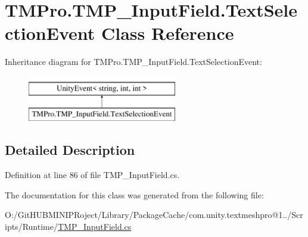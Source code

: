 \hypertarget{class_t_m_pro_1_1_t_m_p___input_field_1_1_text_selection_event}{}\section{T\+M\+Pro.\+T\+M\+P\+\_\+\+Input\+Field.\+Text\+Selection\+Event Class Reference}
\label{class_t_m_pro_1_1_t_m_p___input_field_1_1_text_selection_event}
Inheritance diagram for T\+M\+Pro.\+T\+M\+P\+\_\+\+Input\+Field.\+Text\+Selection\+Event\+:\begin{figure}[H]
\begin{center}
\leavevmode
\includegraphics[height=2.000000cm]{class_t_m_pro_1_1_t_m_p___input_field_1_1_text_selection_event}
\end{center}
\end{figure}


\subsection{Detailed Description}


Definition at line 86 of file T\+M\+P\+\_\+\+Input\+Field.\+cs.



The documentation for this class was generated from the following file\+:\begin{DoxyCompactItemize}
\item 
O\+:/\+Git\+H\+U\+B\+M\+I\+N\+I\+P\+Roject/\+Library/\+Package\+Cache/com.\+unity.\+textmeshpro@1../\+Scripts/\+Runtime/\mbox{\hyperlink{_t_m_p___input_field_8cs}{T\+M\+P\+\_\+\+Input\+Field.\+cs}}\end{DoxyCompactItemize}
